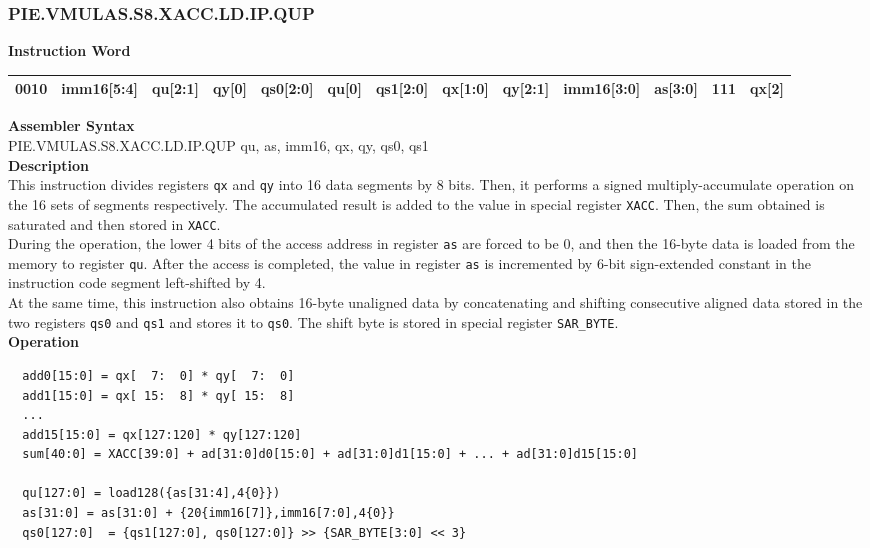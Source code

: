\newpage
\subsubsection{PIE.VMULAS.S8.XACC.LD.IP.QUP}\label{instruction:PIEVMULASS8XACCLDIPQUP}
\setlength\tabcolsep{5pt}
\textbf{Instruction Word} \\
\begin{tabular}{|c|c|c|c|c|c|c|c|c|c|c|c|c|}
	\hline
	0010 & imm16[5:4] & qu[2:1] & qy[0] & qs0[2:0] & qu[0] & qs1[2:0] & qx[1:0] & qy[2:1] & imm16[3:0] & as[3:0] & 111 & qx[2] \\
	\hline
\end{tabular}

\textbf{Assembler Syntax} \\
PIE.VMULAS.S8.XACC.LD.IP.QUP qu, as, imm16, qx, qy, qs0, qs1 \\
\textbf{Description} \\
This instruction divides registers \lstinline{qx} and \lstinline{qy} into 16 data segments by 8 bits. Then, it performs a signed multiply-accumulate operation on the 16 sets of segments respectively. The accumulated result is added to the value in special register \lstinline{XACC}. Then, the sum obtained is saturated and then stored in \lstinline{XACC}.\\
During the operation, the lower 4 bits of the access address in register \lstinline{as} are forced to be 0, and then the 16-byte data is loaded from the memory to register \lstinline{qu}. After the access is completed, the value in register \lstinline{as} is incremented by 6-bit sign-extended constant in the instruction code segment left-shifted by 4.\\
At the same time, this instruction also obtains 16-byte unaligned data by concatenating and shifting consecutive aligned data stored in the two registers \lstinline{qs0} and \lstinline{qs1} and stores it to \lstinline{qs0}. The shift byte is stored in special register \lstinline{SAR_BYTE}.\\
\textbf{Operation}
\begin{lstlisting}
  add0[15:0] = qx[  7:  0] * qy[  7:  0]
  add1[15:0] = qx[ 15:  8] * qy[ 15:  8]
  ...
  add15[15:0] = qx[127:120] * qy[127:120]
  sum[40:0] = XACC[39:0] + ad[31:0]d0[15:0] + ad[31:0]d1[15:0] + ... + ad[31:0]d15[15:0]

  qu[127:0] = load128({as[31:4],4{0}})
  as[31:0] = as[31:0] + {20{imm16[7]},imm16[7:0],4{0}}
  qs0[127:0]  = {qs1[127:0], qs0[127:0]} >> {SAR_BYTE[3:0] << 3}
\end{lstlisting}

